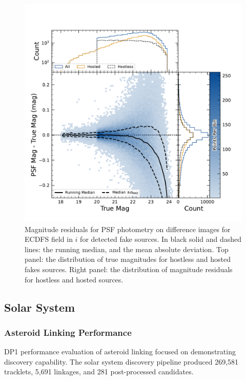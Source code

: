 \begin{figure}
    \centering
    \includegraphics[width=\linewidth]{figures/hexbin_psf_mag.pdf}
    \caption{Magnitude residuals for \gls{PSF} photometry on difference images for ECDFS field in $i$ for detected fake sources. In black solid and dashed lines: the running median, and the mean absolute deviation. Top panel: the distribution of true magnitudes for hostless and hosted fakes sources. Right panel: the distribution of magnitude residuals for hostless and hosted sources.}
    \label{fig:phot_residual_diffim_fakes}
\end{figure}

\subsection{Solar System}
\label{sec:performance:solsys}

\subsubsection{Asteroid Linking Performance}

\gls{DP1} performance evaluation of asteroid linking focused on demonstrating discovery capability.
The solar system discovery \gls{pipeline} produced 269,581 tracklets, 5,691 linkages, and 281 post-processed candidates.

